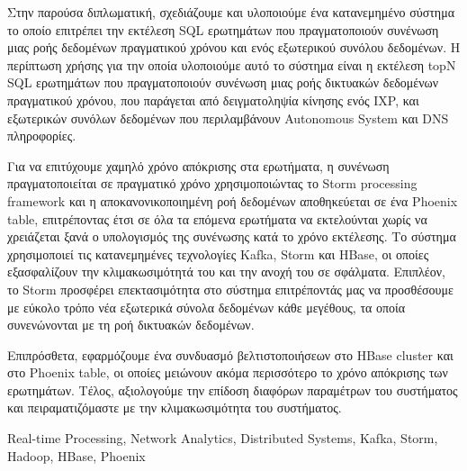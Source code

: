 \begin{abstractgr}

Στην παρούσα διπλωματική, σχεδιάζουμε και υλοποιούμε ένα κατανεμημένο σύστημα το οποίο επιτρέπει την εκτέλεση SQL ερωτημάτων που πραγματοποιούν συνένωση μιας ροής δεδομένων πραγματικού χρόνου και ενός εξωτερικού συνόλου δεδομένων. Η περίπτωση χρήσης για την οποία υλοποιούμε αυτό το σύστημα είναι η εκτέλεση topN SQL ερωτημάτων που πραγματοποιούν συνένωση μιας ροής δικτυακών δεδομένων πραγματικού χρόνου, που παράγεται από δειγματοληψία κίνησης ενός IXP, και εξωτερικών συνόλων δεδομένων που περιλαμβάνουν Autonomous System και DNS πληροφορίες.

Για να επιτύχουμε χαμηλό χρόνο απόκρισης στα ερωτήματα, η συνένωση πραγματοποιείται σε πραγματικό χρόνο χρησιμοποιώντας το Storm processing framework και η αποκανονικοποιημένη ροή δεδομένων αποθηκεύεται σε ένα Phoenix table, επιτρέποντας έτσι σε όλα τα επόμενα ερωτήματα να εκτελούνται χωρίς να χρειάζεται ξανά ο υπολογισμός της συνένωσης κατά το χρόνο εκτέλεσης. Το σύστημα χρησιμοποιεί τις κατανεμημένες τεχνολογίες Kafka, Storm και HBase, οι οποίες εξασφαλίζουν την κλιμακωσιμότητά του και την ανοχή του σε σφάλματα. Επιπλέον, το Storm προσφέρει επεκτασιμότητα στο σύστημα επιτρέποντάς μας να προσθέσουμε με εύκολο τρόπο νέα εξωτερικά σύνολα δεδομένων κάθε μεγέθους, τα οποία συνενώνονται με τη ροή δικτυακών δεδομένων.

Επιπρόσθετα, εφαρμόζουμε ένα συνδυασμό βελτιστοποιήσεων στο HBase cluster και στο Phoenix table, οι οποίες μειώνουν ακόμα περισσότερο το χρόνο απόκρισης των ερωτημάτων. Τέλος, αξιολογούμε την επίδοση διαφόρων παραμέτρων του συστήματος και πειραματιζόμαστε με την κλιμακωσιμότητα του συστήματος.

\begin{keywordsgr}
Real-time Processing, Network Analytics, Distributed Systems, Kafka, Storm, Hadoop, HBase, Phoenix
\end{keywordsgr}
\end{abstractgr}

